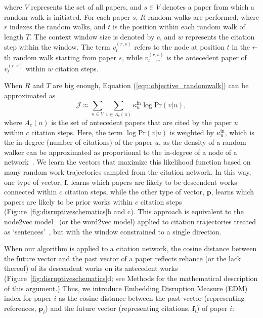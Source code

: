 \documentclass[12pt]{article}
\begin{document}
where $V$ represents the set of all papers, and $s \in V$ denotes a paper from which a random walk is initiated. For each paper $s$, $R$ random walks are performed, where $r$ indexes the random walks, and $t$ is the position within each random walk of length $T$. The context window size is denoted by $c$, and $w$ represents the citation step within the window. The term $v_t^{(r, s)}$ refers to the node at position $t$ in the $r$-th random walk starting from paper $s$, while $v_{t+w}^{(r, s)}$ is the antecedent paper of $v_t^{(r, s)}$ within $w$ citation steps. 

When $R$ and $T$ are big enough, Equation (\ref{eqn:objective_randomwalk}) can be approximated as 
\begin{equation}\label{eqn:objective_intro}
\mathcal{J} \approx    \sum_{u \in V} \sum_{v\in A_c(u)} \kappa_u^{\text{in}}\log \text{Pr}(v | u),
\end{equation}
where $A_c(u)$ is the set of antecedent papers that are cited by the paper $u$ within $c$ citation steps. Here, the term $\log \text{Pr}(v|u)$ is weighted by $\kappa_u^{\text{in}}$, which is the in-degree (number of citations) of the paper $u$, as the density of a random walker can be approximated as proportional to the in-degree of a node of a network~\cite{masuda2017random, fortunato2007random}. We learn the vectors that maximize this likelihood function based on many random work trajectories sampled from the citation network. In this way, one type of vector, $\mathbf{f}$, learns which papers are likely to be descendent works connected within $c$ citation steps, while the other type of vector, $\mathbf{p}$, learns which papers are likely to be prior works within $c$ citation steps (Figure~\ref{fig:disruptiveschematics}b and c). This approach is equivalent to the node2vec model~\cite{grover2016node2vec} (or the word2vec model) applied to citation trajectories treated as `sentences'~\cite{mikolov2013distributed}, but with the window constrained to a single direction.








When our algorithm is applied to a citation network, the cosine distance between the future vector and the past vector of a paper reflects reliance (or the lack thereof) of its descendent works on its antecedent works (Figure~\ref{fig:disruptiveschematics}d; see Methods for the mathematical description of this argument.) Thus, we introduce Embedding Disruption Measure (EDM) index for paper $i$ as the cosine distance between the past vector (representing references, $\mathbf{p}_i$) and the future vector (representing citations, $\mathbf{f}_i$) of paper $i$:
\end{document}
